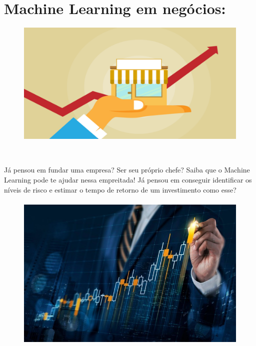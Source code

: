 \documentclass[12pt]{article}
\begin{document}
           \clearpage
           \section*{\centering Machine Learning em negócios:}\label{sec:ML_Negocios}
           \begin{figure}[ht]
           \centering
           \includegraphics[scale=0.4]{ldo-3.1.png}
           \end{figure}
   
  \
  
           Já pensou em fundar uma empresa? Ser seu próprio chefe? Saiba que
o Machine Learning pode te ajudar nessa empreitada! Já pensou em
conseguir identificar os níveis de risco e estimar o tempo de retorno de
um investimento como esse?
            
            \paragraph{}
           \begin{figure}[ht]
           \centering
           \includegraphics[scale=0.5]{ldo-3.2.jpg}
           \end{figure}
           
\end{document}

